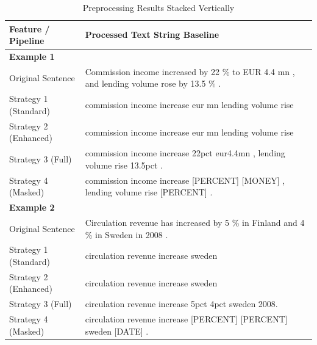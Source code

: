\begin{table}[h]
\centering
\caption{Preprocessing Results Stacked Vertically}
\label{tab:preprocessing_stacked_vertical}
\small
\begin{tabular}{lp{12cm}}
\toprule
\textbf{Feature / Pipeline} & \textbf{Processed Text String Baseline} \\
\midrule
\textbf{Example 1} & \\
Original Sentence & Commission income increased by 22 \% to EUR 4.4 mn , and lending volume rose by 13.5 \% . \\
Strategy 1 (Standard) & commission income increase eur mn lending volume rise \\
Strategy 2 (Enhanced) & commission income increase eur mn lending volume rise \\
Strategy 3 (Full) & commission income increase 22pct eur4.4mn , lending volume rise 13.5pct . \\
Strategy 4 (Masked) & commission income increase [PERCENT] [MONEY] , lending volume rise [PERCENT] . \\
\midrule
\textbf{Example 2} & \\
Original Sentence & Circulation revenue has increased by 5 \% in Finland and 4 \% in Sweden in 2008 . \\
Strategy 1 (Standard) & circulation revenue increase sweden \\
Strategy 2 (Enhanced) & circulation revenue increase sweden \\
Strategy 3 (Full) & circulation revenue increase 5pct 4pct sweden 2008. \\
Strategy 4 (Masked) & circulation revenue increase [PERCENT] [PERCENT] sweden [DATE] . \\
\bottomrule
\end{tabular}
\end{table}